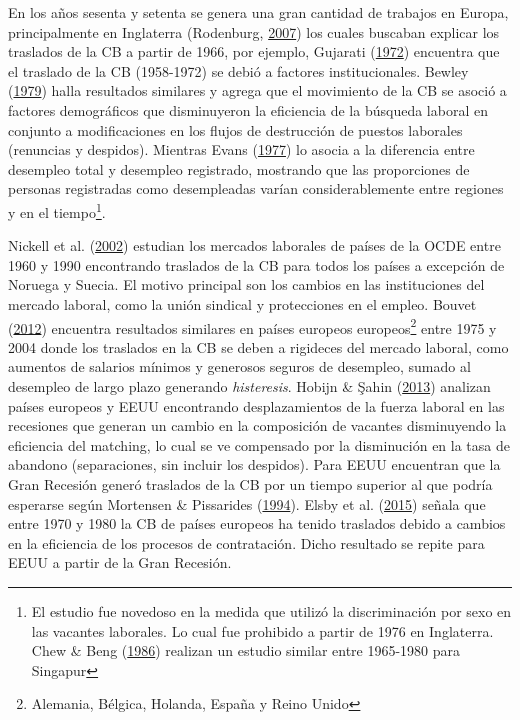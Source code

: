 \documentclass[12pt,oneside]{reedthesis}
\begin{document}
En los años sesenta y setenta se genera una gran cantidad de trabajos en Europa, principalmente en Inglaterra (Rodenburg, \protect\hyperlink{ref-Rodenburg2007}{2007}) los cuales buscaban explicar los traslados de la CB a partir de 1966, por ejemplo, Gujarati (\protect\hyperlink{ref-Gujarati1972}{1972}) encuentra que el traslado de la CB (1958-1972) se debió a factores institucionales. Bewley (\protect\hyperlink{ref-Bewley1979}{1979}) halla resultados similares y agrega que el movimiento de la CB se asoció a factores demográficos que disminuyeron la eficiencia de la búsqueda laboral en conjunto a modificaciones en los flujos de destrucción de puestos laborales (renuncias y despidos). Mientras Evans (\protect\hyperlink{ref-Evans1977}{1977}) lo asocia a la diferencia entre desempleo total y desempleo registrado, mostrando que las proporciones de personas registradas como desempleadas varían considerablemente entre regiones y en el tiempo\footnote{El estudio fue novedoso en la medida que utilizó la discriminación por sexo en las vacantes laborales. Lo cual fue prohibido a partir de 1976 en Inglaterra. Chew \& Beng (\protect\hyperlink{ref-Chew1986}{1986}) realizan un estudio similar entre 1965-1980 para Singapur}.

Nickell et al. (\protect\hyperlink{ref-Nickell2002}{2002}) estudian los mercados laborales de países de la OCDE entre 1960 y 1990 encontrando traslados de la CB para todos los países a excepción de Noruega y Suecia. El motivo principal son los cambios en las instituciones del mercado laboral, como la unión sindical y protecciones en el empleo.
Bouvet (\protect\hyperlink{ref-Bouvet2012}{2012}) encuentra resultados similares en países europeos europeos\footnote{Alemania, Bélgica, Holanda, España y Reino Unido} entre 1975 y 2004 donde los traslados en la CB se deben a rigideces del mercado laboral, como aumentos de salarios mínimos y generosos seguros de desempleo, sumado al desempleo de largo plazo generando \emph{histeresis}.
Hobijn \& Şahin (\protect\hyperlink{ref-Hobijn2013}{2013}) analizan países europeos y EEUU encontrando desplazamientos de la fuerza laboral en las recesiones que generan un cambio en la composición de vacantes disminuyendo la eficiencia del matching, lo cual se ve compensado por la disminución en la tasa de abandono (separaciones, sin incluir los despidos). Para EEUU encuentran que la Gran Recesión generó traslados de la CB por un tiempo superior al que podría esperarse según Mortensen \& Pissarides (\protect\hyperlink{ref-Mortensen1994}{1994}). Elsby et al. (\protect\hyperlink{ref-Elsby2015}{2015}) señala que entre 1970 y 1980 la CB de países europeos ha tenido traslados debido a cambios en la eficiencia de los procesos de contratación. Dicho resultado se repite para EEUU a partir de la Gran Recesión.
\end{document}
